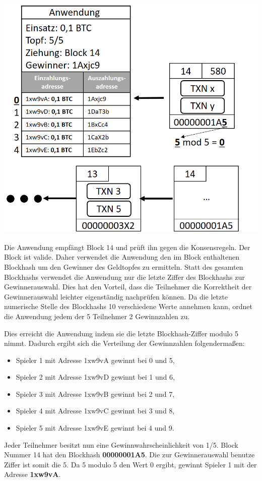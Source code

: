 \vspace{1cm}
\begin{minipage}{0.55\textwidth}
\includegraphics[width=\textwidth]{Figures/konzept_btc/konzept10}
\centering
\decoRule
{}
\label{fig:konzept10}
\end{minipage}
\begin{minipage}{0.45\textwidth}
Die Anwendung empfängt Block 14 und prüft ihn gegen die Konsensregeln. Der Block ist valide. Daher verwendet die Anwendung den im Block enthaltenen Blockhash um den Gewinner des Geldtopfes zu ermitteln. Statt des gesamten Blockhashs verwendet die Anwendung nur die letzte Ziffer des Blockhashs zur Gewinnerauswahl. Dies hat den Vorteil, dass die Teilnehmer die Korrektheit der Gewinnerauswahl leichter eigenständig nachprüfen können.
Da die letzte numerische Stelle des Blockhashs 10 verschiedene Werte annehmen kann, ordnet die Anwendung jedem der 5 Teilnehmer 2 Gewinnzahlen zu.
\end{minipage}

\vspace{1cm}
Dies erreicht die Anwendung indem sie die letzte Blockhash-Ziffer modulo 5 nimmt. Dadurch ergibt sich die Verteilung der Gewinnzahlen folgendermaßen:
\begin{itemize}
\item Spieler 1 mit Adresse 1xw9vA gewinnt bei 0 und 5,
\item Spieler 2 mit Adresse 1xw9vD gewinnt bei 1 und 6,
\item Spieler 3 mit Adresse 1xw9vB gewinnt bei 2 und 7,
\item Spieler 4 mit Adresse 1xw9vC gewinnt bei 3 und 8,
\item Spieler 5 mit Adresse 1xw9vE gewinnt bei 4 und 9.
\end{itemize}
Jeder Teilnehmer besitzt nun eine Gewinnwahrscheinlichkeit von 1/5. Block Nummer 14 hat den Blockhash \textbf{00000001A5}. Die zur Gewinnerauswahl benutze Ziffer ist somit die 5. Da 5 modulo 5 den Wert 0 ergibt, gewinnt Spieler 1 mit der Adresse \textbf{1xw9vA}.

